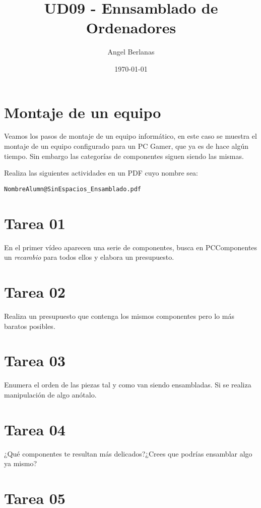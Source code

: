 \documentclass[11pt]{article}
\author{Angel Berlanas}
\date{\today}
\title{UD09 - Ennsamblado de Ordenadores}
\begin{document}
\maketitle
\tableofcontents


\section{Montaje de un equipo}
\label{sec:orga6e75da}

Veamos los pasos de montaje de un equipo informático, en este caso se muestra
el montaje de un equipo configurado para un PC Gamer, que ya es de hace algún
tiempo. Sin embargo las categorías de componentes siguen siendo las mismas. 

Realiza las siguientes actividades en un PDF cuyo nombre sea:

\texttt{NombreAlumn@SinEspacios\_Ensamblado.pdf}

\section{Tarea 01}
\label{sec:org7a4ddc2}

En el primer vídeo aparecen una serie de componentes, busca en PCComponentes
un \emph{recambio} para todos ellos y elabora un presupuesto.

\section{Tarea 02}
\label{sec:orge6b3e48}

Realiza un presupuesto que contenga los mismos componentes pero lo más baratos
posibles.

\section{Tarea 03}
\label{sec:org299786a}

Enumera el orden de las piezas tal y como van siendo ensambladas. Si se
realiza manipulación de algo anótalo. 

\section{Tarea 04}
\label{sec:org018d8fc}

¿Qué componentes te resultan más delicados?¿Crees que podrías ensamblar algo
ya mismo?


\section{Tarea 05}
\label{sec:orgb01578b}
\end{document}
